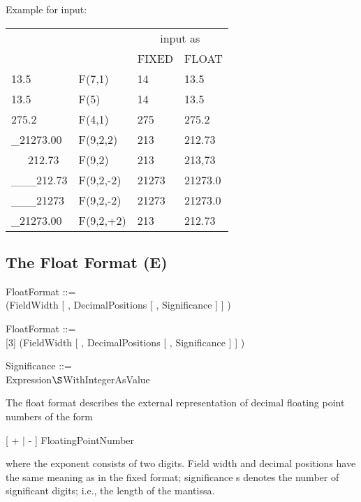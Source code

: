 \begin{added}
Example for input:

\begin{tabular}{llll}
       &          & \multicolumn{2}{c}{input as}  \\ 
       &          & FIXED & FLOAT  \\ \hline
13.5   & F(7,1)   &  14 & 13.5   \\
13.5   & F(5)     &  14 & 13.5   \\
275.2  & F(4,1)   & 275 & 275.2 \\
\_21273.00 & F(9,2,2) & 213 & 212.73 \\
\ \ \ 212.73 &  F(9,2)&  213 & 213,73 \\
\_\_\_212.73 & F(9,2,-2) & 21273 & 21273.0 \\
\_\_\_21273 & F(9,2,-2) & 21273 & 21273.0 \\
\_21273.00 & F(9,2,+2)   & 213 & 212.73 \\
\end{tabular}

\end{added}

\subsection{The Float Format (E)}   %
\label{sec_dation_e_format}

\begin{removed}
FloatFormat ::=\\
 (FieldWidth [ , DecimalPositions [ , Significance ] ] )
\end{removed}
\begin{added}
FloatFormat ::=\\
[3] (FieldWidth [ , DecimalPositions [ , Significance ] ] )
\end{added}

Significance ::= \\
\x Expression$\S $WithIntegerAsValue

The float format describes the external representation of decimal
floating point numbers of the form

[ + $\mid$ - ] FloatingPointNumber

where the exponent consists of two  digits.
 Field width and decimal
positions have the same meaning as in the fixed format; significance s
denotes the number of significant digits; i.e., the length of the
mantissa.

